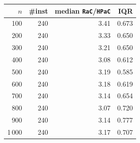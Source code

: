 \begin{tabular}{@{}rrrr@{}}
\toprule
$n$ & \#inst & median \texttt{RaC}/\texttt{HPaC} & IQR \\
\midrule
100 & 240 & 3.41 & 0.673 \\
200 & 240 & 3.33 & 0.650 \\
300 & 240 & 3.21 & 0.650 \\
400 & 240 & 3.08 & 0.612 \\
500 & 240 & 3.19 & 0.585 \\
600 & 240 & 3.18 & 0.619 \\
700 & 240 & 3.14 & 0.654 \\
800 & 240 & 3.07 & 0.720 \\
900 & 240 & 3.14 & 0.777 \\
1\,000 & 240 & 3.17 & 0.707 \\
\bottomrule
\end{tabular}
